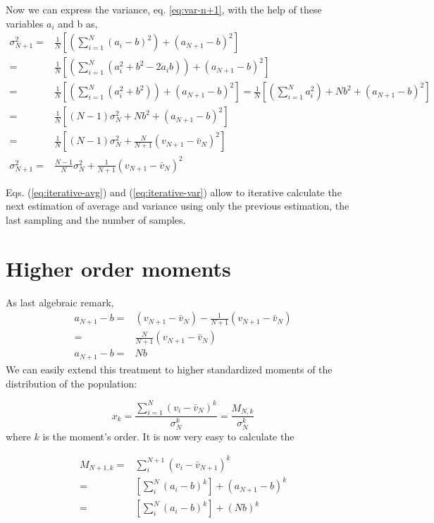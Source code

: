 \documentclass[a4paper]{article}
\newcommand{\avg}{\bar{v}}
\begin{document}
Now we can express the variance, eq. \ref{eq:var-n+1}, with the help of 
these variables $a_i$ and b as,
\begin{align}
\sigma_{N+1}^2  = & \frac{1}{N} \left[\left(\sum_{i=1}^{N} \left(a_i -
b\right)^2 \right) 
 + \left(a_{N+1} - b\right)^2\right] \\
 = & \frac{1}{N} \left[\left(\sum_{i=1}^{N} \left(a_i^2 +
b^2 - 2a_ib\right) \right) 
 + \left(a_{N+1} - b\right)^2\right] \nonumber \\
 = & \frac{1}{N} \left[\left(\sum_{i=1}^{N} \left(a_i^2 +
b^2 \right) \right) 
+ \left(a_{N+1} - b\right)^2\right] = 
  \frac{1}{N} \left[\left(\sum_{i=1}^{N} a_i^2 \right) +
N b^2  
 + \left(a_{N+1} - b\right)^2\right] \nonumber \\
 = & \frac{1}{N} \left[(N-1)\sigma_N^2  +
N b^2  
 + \left(a_{N+1} - b\right)^2\right] \nonumber \\
 = & \frac{1}{N} \left[(N-1)\sigma_N^2  +
 \frac{N}{N+1} \left(v_{N+1} - \avg_N \right)^2
 \right] \nonumber \\
 \sigma_{N+1}^2 = & \frac{N-1}{N} \sigma_N^2  +
 \frac{1}{N+1} \left(v_{N+1} - \avg_N \right)^2
 \label{eq:iterative-var}
\end{align}

Eqs. (\ref{eq:iterative-avg}) and (\ref{eq:iterative-var}) allow to iterative
calculate the next estimation of average and variance using only the previous
estimation, the last sampling and the number of samples. 

\section{Higher order moments}
As last algebraic remark, 
\begin{align}
a_{N+1} - b = & (v_{N+1} - \avg_N) - \frac{1}{N+1} (v_{N+1} - \avg_N)
\nonumber \\
 = & \frac{N}{N+1} (v_{N+1} - \avg_N) \nonumber \\
 a_{N+1} - b= & N b
\end{align}
We can easily extend this treatment to higher standardized moments of the 
distribution of the population:

\begin{equation}
x_k = \frac{\sum_{i=1}^N \left(v_i - \avg_N\right)^k}{\sigma^k_N} =
\frac{M_{N,k}}{\sigma^k_N}
\end{equation}
where $k$ is the moment's order. It is now very easy to calculate the

\begin{align}
M_{N+1,k} = & \sum_i^{N+1} (v_i - \avg_{N+1})^k \nonumber \\
 = & \left[\sum_i^N (a_i - b)^k\right] + (a_{N+1} - b) ^k \nonumber \\
 = & \left[\sum_i^N (a_i - b)^k \right]+ (Nb)^k
 \label{eq:kth-moment}
\end{align}
\end{document}
